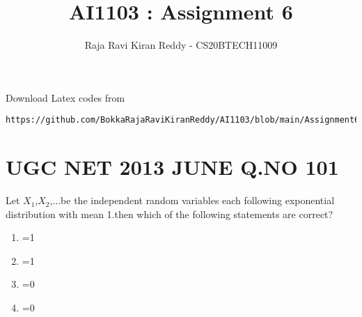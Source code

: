 \documentclass[journal,12pt,twocolumn]{IEEEtran}
\begin{document}
\let\vec\mathbf
\renewcommand{\thefigure}{\theproblem}
\def\putbox#1#2#3{\makebox[0in][l]{\makebox[#1][l]{}\raisebox{\baselineskip}[0in][0in]{\raisebox{#2}[0in][0in]{#3}}}}
     \def\rightbox#1{\makebox[0in][r]{#1}}
     \def\centbox#1{\makebox[0in]{#1}}
     \def\topbox#1{\raisebox{-\baselineskip}[0in][0in]{#1}}
     \def\midbox#1{\raisebox{-0.5\baselineskip}[0in][0in]{#1}}
\vspace{3cm}
\title{AI1103 : Assignment 6}
\author{Raja Ravi Kiran Reddy - CS20BTECH11009}
\maketitle
\newpage
\bigskip
\renewcommand{\thefigure}{\arabic{figure}}
\renewcommand{\thetable}{\arabic{table}}
%
Download Latex codes from 
%
\begin{lstlisting}
https://github.com/BokkaRajaRaviKiranReddy/AI1103/blob/main/Assignment6/Assignment6.tex
\end{lstlisting}
\section{UGC NET 2013 JUNE Q.NO 101}
Let $X_1$,$X_2$,...be the independent random variables each following exponential distribution with mean 1.then which of the following statements are correct?
\begin{enumerate}
    \item {}=1\\
    \item {}=1\\
    \item {}=0\\
    \item  {}=0 
\end{enumerate}
\end{document}
